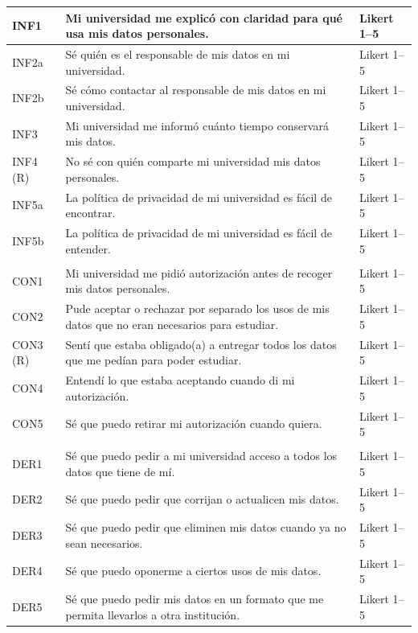 {\begin{xltabular}{\textwidth}{|>{\raggedright\arraybackslash}p{1.1cm}|>{\raggedright\arraybackslash}X|>{\raggedright\arraybackslash}p{4.6cm}|}
  INF1 & Mi universidad me explicó con claridad para qué usa mis datos personales. & Likert 1--5 \\ \hline
  INF2a & Sé quién es el responsable de mis datos en mi universidad. & Likert 1--5 \\ \hline
  INF2b & Sé cómo contactar al responsable de mis datos en mi universidad. & Likert 1--5 \\ \hline
  INF3 & Mi universidad me informó cuánto tiempo conservará mis datos. & Likert 1--5 \\ \hline
  INF4 (R) & No sé con quién comparte mi universidad mis datos personales. & Likert 1--5 \\ \hline
  INF5a & La política de privacidad de mi universidad es fácil de encontrar. & Likert 1--5 \\ \hline
  INF5b & La política de privacidad de mi universidad es fácil de entender. & Likert 1--5 \\ \hline
   \\ \hline
  CON1 & Mi universidad me pidió autorización antes de recoger mis datos personales. & Likert 1--5 \\ \hline
  CON2 & Pude aceptar o rechazar por separado los usos de mis datos que no eran necesarios para estudiar. & Likert 1--5 \\ \hline
  CON3 (R) & Sentí que estaba obligado(a) a entregar todos los datos que me pedían para poder estudiar. & Likert 1--5 \\ \hline
  CON4 & Entendí lo que estaba aceptando cuando di mi autorización. & Likert 1--5 \\ \hline
  CON5 & Sé que puedo retirar mi autorización cuando quiera. & Likert 1--5 \\ \hline
   \\ \hline
  DER1 & Sé que puedo pedir a mi universidad acceso a todos los datos que tiene de mí. & Likert 1--5 \\ \hline
  DER2 & Sé que puedo pedir que corrijan o actualicen mis datos. & Likert 1--5 \\ \hline
  DER3 & Sé que puedo pedir que eliminen mis datos cuando ya no sean necesarios. & Likert 1--5 \\ \hline
  DER4 & Sé que puedo oponerme a ciertos usos de mis datos. & Likert 1--5 \\ \hline
  DER5 & Sé que puedo pedir mis datos en un formato que me permita llevarlos a otra institución. & Likert 1--5 \\ \hline

\end{xltabular}}
